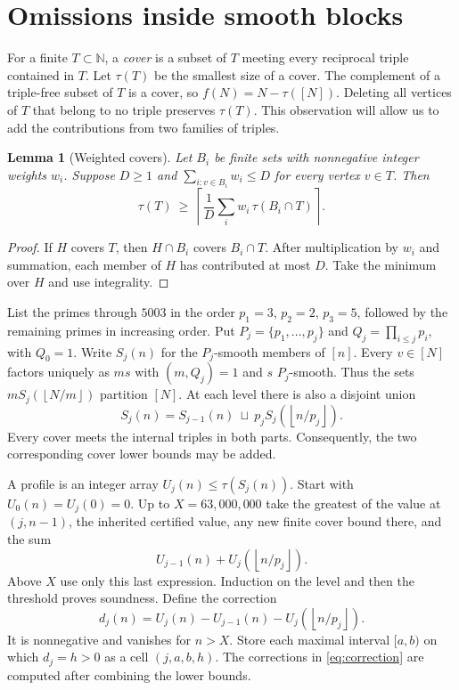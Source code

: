 \documentclass[11pt,letterpaper]{article}
\newtheorem{lemma}[theorem]{Lemma}
\theoremstyle{definition}
\newcommand{\N}{\mathbb N}
\newcommand{\floor}[1]{\left\lfloor #1\right\rfloor}
\newcommand{\ceil}[1]{\left\lceil #1\right\rceil}
\begin{document}
\section{Omissions inside smooth blocks}
For a finite $T\subset\N$, a \emph{cover} is a subset of $T$ meeting
every reciprocal triple contained in $T$. Let $\tau(T)$ be the smallest
size of a cover. The complement of a triple-free subset of $T$ is a
cover, so $f(N)=N-\tau([N])$. Deleting all vertices of $T$ that belong
to no triple preserves $\tau(T)$. This observation will allow us to add
the contributions from two families of triples.

\begin{lemma}[Weighted covers]\label{lem:covers}
Let $B_i$ be finite sets with nonnegative integer weights $w_i$. Suppose
$D\ge1$ and $\sum_{i:v\in B_i}w_i\le D$ for every vertex $v\in T$.
Then
\[
  \tau(T)\ \ge\
  \ceil{\frac{1}{D}\sum_i w_i\,\tau(B_i\cap T)}.
\]
\end{lemma}
\begin{proof}
If $H$ covers $T$, then $H\cap B_i$ covers $B_i\cap T$.
After multiplication by $w_i$ and summation, each member of $H$
has contributed at most $D$. Take the minimum over $H$ and use
integrality.
\end{proof}

List the primes through $5003$ in the order $p_1=3$, $p_2=2$,
$p_3=5$, followed by the remaining primes in increasing order.
Put $P_j=\{p_1,\ldots,p_j\}$ and $Q_j=\prod_{i\le j}p_i$, with
$Q_0=1$. Write $S_j(n)$ for the $P_j$-smooth members of $[n]$.
Every $v\in[N]$ factors uniquely as $m s$ with $(m,Q_j)=1$ and $s$
$P_j$-smooth. Thus the sets $mS_j(\floor{N/m})$ partition $[N]$.
At each level there is also a disjoint union
\begin{equation}
 S_j(n)=S_{j-1}(n)\ \sqcup\ p_j S_j(\floor{n/p_j}).
 \label{eq:split}
\end{equation}
Every cover meets the internal triples in both parts. Consequently,
the two corresponding cover lower bounds may be added.

A profile is an integer array $U_j(n)\le\tau(S_j(n))$. Start with
$U_0(n)=U_j(0)=0$. Up to $X=63{,}000{,}000$ take the greatest of
the value at $(j,n-1)$, the inherited certified value, any new finite
cover bound there, and the sum
\[
 U_{j-1}(n)+U_j(\floor{n/p_j}).
\]
Above $X$ use only this last expression. Induction on the level and
then the threshold proves soundness. Define the correction
\begin{equation}
 d_j(n)=U_j(n)-U_{j-1}(n)-U_j(\floor{n/p_j}).
 \label{eq:correction}
\end{equation}
It is nonnegative and vanishes for $n>X$. Store each maximal interval
$[a,b)$ on which $d_j=h>0$ as a cell $(j,a,b,h)$. The corrections
in \eqref{eq:correction} are computed after combining the lower bounds.
\end{document}
